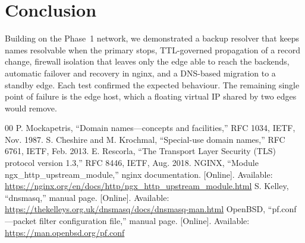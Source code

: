 \documentclass[conference]{IEEEtran}
\begin{document}
\section{Conclusion}
Building on the Phase~1 network, we demonstrated a backup resolver that keeps names resolvable when the primary stops, TTL-governed propagation of a record change, firewall isolation that leaves only the edge able to reach the backends, automatic failover and recovery in nginx, and a DNS-based migration to a standby edge. Each test confirmed the expected behaviour. The remaining single point of failure is the edge host, which a floating virtual IP shared by two edges would remove.

\begin{thebibliography}{00}
 P. Mockapetris, ``Domain names---concepts and facilities,'' RFC 1034, IETF, Nov. 1987.
 S. Cheshire and M. Krochmal, ``Special-use domain names,'' RFC 6761, IETF, Feb. 2013.
 E. Rescorla, ``The Transport Layer Security (TLS) protocol version 1.3,'' RFC 8446, IETF, Aug. 2018.
 NGINX, ``Module ngx\_http\_upstream\_module,'' nginx documentation. [Online]. Available: \url{https://nginx.org/en/docs/http/ngx_http_upstream_module.html}
 S. Kelley, ``dnsmasq,'' manual page. [Online]. Available: \url{https://thekelleys.org.uk/dnsmasq/docs/dnsmasq-man.html}
 OpenBSD, ``pf.conf---packet filter configuration file,'' manual page. [Online]. Available: \url{https://man.openbsd.org/pf.conf}
\end{thebibliography}
\end{document}
